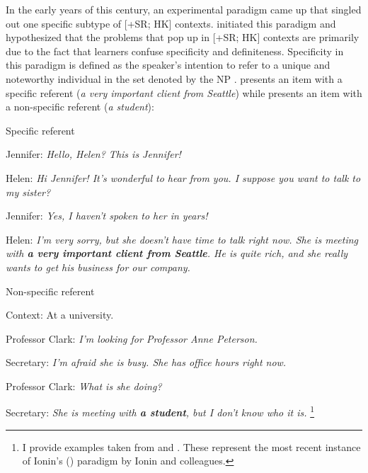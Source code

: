\documentclass[output=paper,
modfonts
]{langscibook}
\begin{document}
In the early years of this century, an experimental paradigm came up that singled out one specific subtype of [+SR; \textminus HK] contexts. \citet{Ionin2003} initiated this paradigm and hypothesized that the problems that pop up in [+SR; \textminus HK] contexts are primarily due to the fact that learners confuse specificity and definiteness. Specificity in this paradigm is defined as the speaker’s intention to refer to a unique and noteworthy individual in the set denoted by the NP \citep{IoninKoWexler2004}.  presents an item with a specific referent (\textit{a very important client from Seattle}) while  presents an item with a non-specific referent (\textit{a student}):

\ea\label{ex:lebruyn:1} {Specific referent}

Jennifer: \textit{Hello, Helen? This is Jennifer!}

Helen: \textit{Hi Jennifer! It’s wonderful to hear from you. I suppose you want to talk to my sister?}

Jennifer: \textit{Yes, I haven’t spoken to her in years!}

Helen: \textit{I’m very sorry, but she doesn’t have time to talk right now. She is meeting with \textbf{a very important client from Seattle}. He is quite rich, and she really wants to get his business for our company.} \citep[239]{KoIoninWexler2010}
\z

\ea\label{ex:lebruyn:2} {Non-specific referent}

Context: At a university.

Professor Clark: \textit{I’m looking for Professor Anne Peterson.}

Secretary: \textit{I’m afraid she is busy. She has office hours right now.}

Professor Clark: \textit{What is she doing?}

Secretary: \textit{She is meeting with \textbf{a student}, but I don’t know who it is.} \citep[68]{IoninKoWexler2004}\footnote{I provide examples taken from \citet{KoIoninWexler2010} and \citet{IoninKoWexler2004}. These represent the most recent instance of Ionin’s (\citeyear{Ionin2003}) paradigm by Ionin and colleagues.} 
\z
\end{document}
